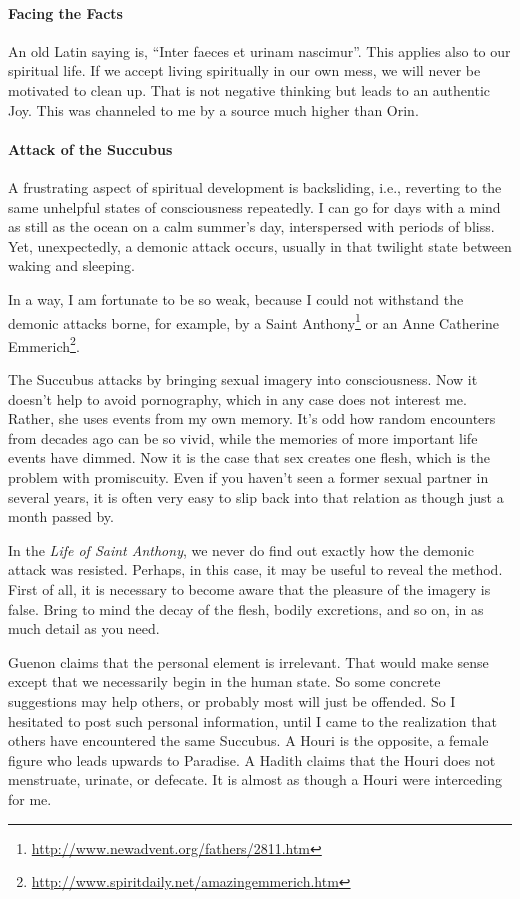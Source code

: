 \paragraph{Facing the Facts}


An old Latin saying is, ``Inter faeces et urinam nascimur''. This applies also to our spiritual life. If we accept living spiritually in our own mess, we will never be motivated to clean up. That is not negative thinking but leads to an authentic Joy. This was channeled to me by a source much higher than Orin.

\paragraph{Attack of the Succubus}


A frustrating aspect of spiritual development is backsliding, i.e., reverting to the same unhelpful states of consciousness repeatedly. I can go for days with a mind as still as the ocean on a calm summer's day, interspersed with periods of bliss. Yet, unexpectedly, a demonic attack occurs, usually in that twilight state between waking and sleeping.

In a way, I am fortunate to be so weak, because I could not withstand the demonic attacks borne, for example, by a Saint Anthony\footnote{\url{http://www.newadvent.org/fathers/2811.htm}} or an Anne Catherine Emmerich\footnote{\url{http://www.spiritdaily.net/amazingemmerich.htm}}.

The Succubus attacks by bringing sexual imagery into consciousness. Now it doesn't help to avoid pornography, which in any case does not interest me. Rather, she uses events from my own memory. It's odd how random encounters from decades ago can be so vivid, while the memories of more important life events have dimmed. Now it is the case that sex creates one flesh, which is the problem with promiscuity. Even if you haven't seen a former sexual partner in several years, it is often very easy to slip back into that relation as though just a month passed by.

In the \emph{Life of Saint Anthony}, we never do find out exactly how the demonic attack was resisted. Perhaps, in this case, it may be useful to reveal the method. First of all, it is necessary to become aware that the pleasure of the imagery is false. Bring to mind the decay of the flesh, bodily excretions, and so on, in as much detail as you need.

Guenon claims that the personal element is irrelevant. That would make sense except that we necessarily begin in the human state. So some concrete suggestions may help others, or probably most will just be offended. So I hesitated to post such personal information, until I came to the realization that others have encountered the same Succubus. A Houri is the opposite, a female figure who leads upwards to Paradise. A Hadith claims that the Houri does not menstruate, urinate, or defecate. It is almost as though a Houri were interceding for me.

